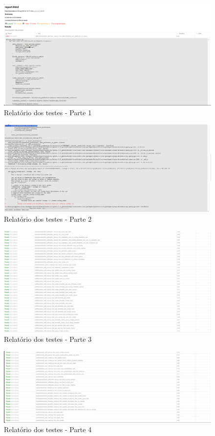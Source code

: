 \documentclass[12pt]{article}
\begin{document}
\begin{figure}[h]
    \centering
    \includegraphics[width=1\textwidth]{relatorioparte1.png}
    \caption{Relatório dos testes - Parte 1}
    \label{fig:relatorio1}
\end{figure}
\begin{figure}[h]
    \centering
    \includegraphics[width=1\textwidth]{relatorioparte2.png}
    \caption{Relatório dos testes - Parte 2}
    \label{fig:relatorio2}
\end{figure}
\begin{figure}[h]
    \centering
    \includegraphics[width=1\textwidth]{relatorioparte3.png}
    \caption{Relatório dos testes - Parte 3}
    \label{fig:relatorio3}
\end{figure}
\begin{figure}[h]
    \centering
    \includegraphics[width=1\textwidth]{relatorioparte4.png}
    \caption{Relatório dos testes - Parte 4}
    \label{fig:relatorio4}
\end{figure}
\end{document}
